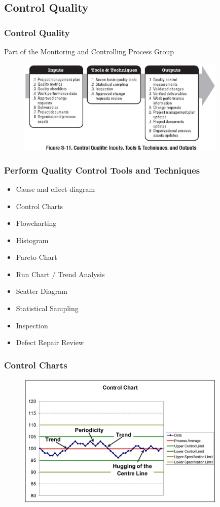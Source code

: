 \subsection{Control Quality}

\begin{frame}
\frametitle{Control Quality}
Part of the Monitoring and Controlling Process Group
\begin{figure}
	\centering
		\includegraphics[width = 10cm]{images/Fig8-11.jpg}
	\label{fig:8-10}
\end{figure}
\end{frame}




\begin{frame}
\frametitle{Perform Quality Control \hfill Tools and Techniques}
\begin{itemize} 
	\item Cause and effect diagram \checkmark
	\item Control Charts 
	\item Flowcharting
	\item Histogram
	\item Pareto Chart
	\item Run Chart / Trend Analysis
	\item Scatter Diagram
	\item Statistical Sampling
	\item Inspection
	\item Defect Repair Review
\end{itemize}
\end{frame}




\begin{frame}
\frametitle{Control Charts}
\begin{figure}
	\centering
		\includegraphics[width = 10cm]{images/controlchart.jpg}
	\label{fig:controlchart}
\end{figure}
\end{frame}




